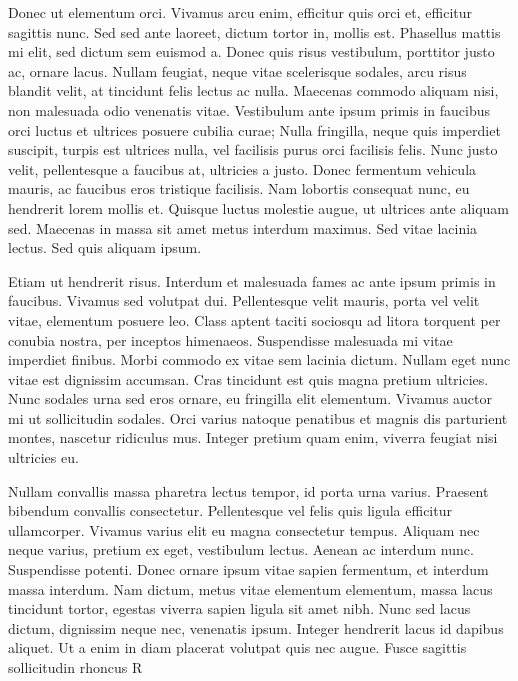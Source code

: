Donec ut elementum orci. Vivamus arcu enim, efficitur quis orci et, efficitur sagittis nunc. Sed sed ante laoreet, dictum tortor in, mollis est. Phasellus mattis mi elit, sed dictum sem euismod a. Donec quis risus vestibulum, porttitor justo ac, ornare lacus. Nullam feugiat, neque vitae scelerisque sodales, arcu risus blandit velit, at tincidunt felis lectus ac nulla. Maecenas commodo aliquam nisi, non malesuada odio venenatis vitae. Vestibulum ante ipsum primis in faucibus orci luctus et ultrices posuere cubilia curae; Nulla fringilla, neque quis imperdiet suscipit, turpis est ultrices nulla, vel facilisis purus orci facilisis felis. Nunc justo velit, pellentesque a faucibus at, ultricies a justo. Donec fermentum vehicula mauris, ac faucibus eros tristique facilisis. Nam lobortis consequat nunc, eu hendrerit lorem mollis et. Quisque luctus molestie augue, ut ultrices ante aliquam sed. Maecenas in massa sit amet metus interdum maximus. Sed vitae lacinia lectus. Sed quis aliquam ipsum.

Etiam ut hendrerit risus. Interdum et malesuada fames ac ante ipsum primis in faucibus. Vivamus sed volutpat dui. Pellentesque velit mauris, porta vel velit vitae, elementum posuere leo. Class aptent taciti sociosqu ad litora torquent per conubia nostra, per inceptos himenaeos. Suspendisse malesuada mi vitae imperdiet finibus. Morbi commodo ex vitae sem lacinia dictum. Nullam eget nunc vitae est dignissim accumsan. Cras tincidunt est quis magna pretium ultricies. Nunc sodales urna sed eros ornare, eu fringilla elit elementum. Vivamus auctor mi ut sollicitudin sodales. Orci varius natoque penatibus et magnis dis parturient montes, nascetur ridiculus mus. Integer pretium quam enim, viverra feugiat nisi ultricies eu.

Nullam convallis massa pharetra lectus tempor, id porta urna varius. Praesent bibendum convallis consectetur. Pellentesque vel felis quis ligula efficitur ullamcorper. Vivamus varius elit eu magna consectetur tempus. Aliquam nec neque varius, pretium ex eget, vestibulum lectus. Aenean ac interdum nunc. Suspendisse potenti. Donec ornare ipsum vitae sapien fermentum, et interdum massa interdum. Nam dictum, metus vitae elementum elementum, massa lacus tincidunt tortor, egestas viverra sapien ligula sit amet nibh. Nunc sed lacus dictum, dignissim neque nec, venenatis ipsum. Integer hendrerit lacus id dapibus aliquet. Ut a enim in diam placerat volutpat quis nec augue. Fusce sagittis sollicitudin rhoncus
\vfill
\supereject
\if R\lr \null\vfill\eject\fi

